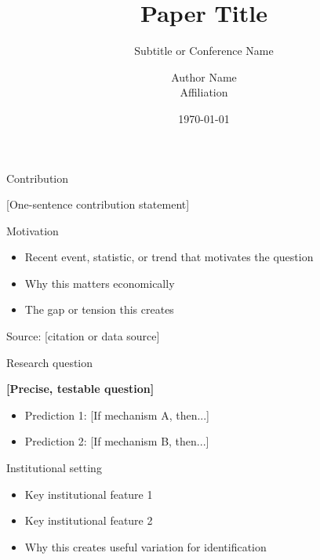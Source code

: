 \documentclass[aspectratio=169,11pt]{beamer}
\title{Paper Title}
\subtitle{Subtitle or Conference Name}
\author{Author Name \\ \small{Affiliation}}
\date{\today}
\institute{}
\begin{document}
\begin{frame}[plain]
\titlepage
\end{frame}

\begin{frame}{Contribution}
\begin{center}
\large
[One-sentence contribution statement]
\end{center}
\end{frame}

\begin{frame}{Motivation}
\begin{itemize}
    \item Recent event, statistic, or trend that motivates the question
    \item Why this matters economically
    \item The gap or tension this creates
\end{itemize}
\vfill
\textcolor{MedGray}{\scriptsize Source: [citation or data source]}
\end{frame}

\begin{frame}{Research question}
\begin{center}
\large
\textbf{[Precise, testable question]}
\end{center}
\vspace{1cm}
\begin{itemize}
    \item Prediction 1: [If mechanism A, then...]
    \item Prediction 2: [If mechanism B, then...]
\end{itemize}
\end{frame}

\begin{frame}{Institutional setting}
\begin{itemize}
    \item Key institutional feature 1
    \item Key institutional feature 2
    \item Why this creates useful variation for identification
\end{itemize}
\end{frame}
\end{document}
